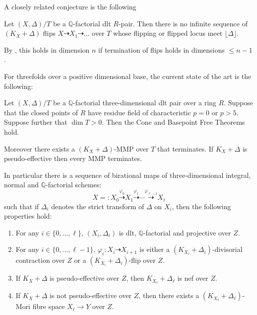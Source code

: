 A closely related conjecture is the following

\begin{conjecture}
	
	Let $(X,\Delta)/T$ be a $\mathbb{Q}$-factorial dlt $R$-pair. Then there is no infinite sequence of $(K_{X}+\Delta)$ flips $X \dashrightarrow X_{1} \dashrightarrow ...$ over $T$ whose flipping or flipped locus meet $\lfloor \Delta \rfloor$.
	
\end{conjecture}

By \cite[4.2.1]{fujino2007special}, this holds in dimension $n$ if termination of flips holds in dimensions $\leq n-1$.

For threefolds over a positive dimensional base, the current state of the art is the following:

	\begin{theorem}\cite{bhatt2020}\label{MMP}
	Let $(X, \Delta)/T$ be a $\mathbb{Q}$-factorial three-dimensional dlt pair over a ring $R$. Suppose that the closed points of $R$ have residue field of characteristic $p=0$ or $p> 5$. Suppose further that $\dim T >0$. Then the Cone and Basepoint Free Theorems hold.
	
	Moreover there exists a $(K_X+\Delta)$-MMP over $T$ that terminates. If $K_{X}+\Delta$ is pseudo-effective then every MMP terminates.
	
	In particular there is a sequence of birational maps of three-dimensional integral, normal and $\mathbb{Q}$-factorial schemes:  
	\[
	X=:X_0 \overset{\varphi_0}{\dashrightarrow} X_1 \overset{\varphi_1}{\dashrightarrow} \cdots \overset{\varphi_{\ell-1}}{\dashrightarrow} X_{\ell}
	\]
	such that if $\Delta_i$ denotes the strict transform of $\Delta$ on $X_i$, then
	the following properties hold:  
	\begin{enumerate}
		\item 
		For any $i \in \{0, \ldots, \ell\}$, 
		$(X_i, \Delta_i)$ is dlt, $\mathbb{Q}$-factorial and projective over $Z$.
		\item 
		For any $i \in \{0, \ldots, \ell-1\}$, 
		$\varphi_i\colon X_i \dashrightarrow X_{i+1}$ is either a $(K_{X_i}+\Delta_i)$-divisorial contraction over $Z$ or a $(K_{X_i}+\Delta_i)$-flip over $Z$. 
		\item 
		If $K_X+\Delta$ is pseudo-effective over $Z$, then $K_{X_{\ell}}+\Delta_{\ell}$ is nef over $Z$. 
		\item 
		If $K_X+\Delta$ is not pseudo-effective over $Z$, then 
		there exists a $(K_{X_{\ell}}+\Delta_{\ell})$-Mori fibre space $X_{\ell} \to Y$ over $Z$. 
	\end{enumerate}
\end{theorem}

